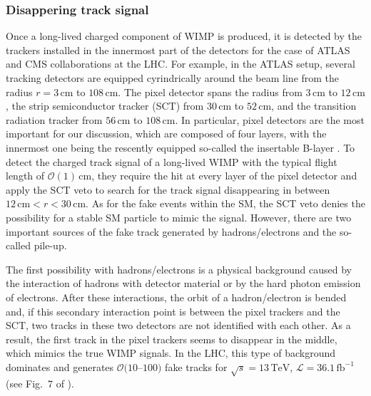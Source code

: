 \documentclass[12pt,twoside,book]{article}
\begin{document}
\subsubsection*{Disappering track signal}

Once a long-lived charged component of WIMP is produced, it is detected by the trackers installed in the innermost part of the detectors for the case of ATLAS and CMS collaborations at the LHC.
For example, in the ATLAS setup, several tracking detectors are equipped cyrindrically around the beam line from the radius $r = 3\,\mathrm{cm}$ to $108\,\mathrm{cm}$.
The pixel detector spans the radius from $3\,\mathrm{cm}$ to $12\,\mathrm{cm}$, the strip semiconductor tracker (SCT) from $30\,\mathrm{cm}$ to $52\,\mathrm{cm}$, and the transition radiation tracker from $56\,\mathrm{cm}$ to $108\,\mathrm{cm}$.
In particular, pixel detectors are the most important for our discussion, which are composed of four layers, with the innermost one being the rescently equipped so-called the insertable B-layer \cite{Capeans:1291633, CERN-LHCC-2012-009, Abbott:2018ikt}.
To detect the charged track signal of a long-lived WIMP with the typical flight length of $\mathcal{O} (1)\, \mathrm{cm}$, they require the hit at every layer of the pixel detector and apply the SCT veto to search for the track signal disappearing in between $12\,\mathrm{cm} < r < 30\,\mathrm{cm}$.
As for the fake events within the SM, the SCT veto denies the possibility for a stable SM particle to mimic the signal.
However, there are two important sources of the fake track generated by hadrons/electrons and the so-called pile-up.

The first possibility with hadrons/electrons is a physical background caused by the interaction of hadrons with detector material or by the hard photon emission of electrons.
After these interactions, the orbit of a hadron/electron is bended and, if this secondary interaction point is between the pixel trackers and the SCT, two tracks in these two detectors are not identified with each other.
As a result, the first track in the pixel trackers seems to disappear in the middle, which mimics the true WIMP signals.
In the LHC, this type of background dominates and generates $\mathcal{O}(10$--$100)$ fake tracks for $\sqrt{s}=13\,\mathrm{TeV}$, $\mathcal{L} = 36.1\,\mathrm{fb}^{-1}$ (see Fig.~7 of \cite{Aaboud:2017mpt}).
\end{document}
